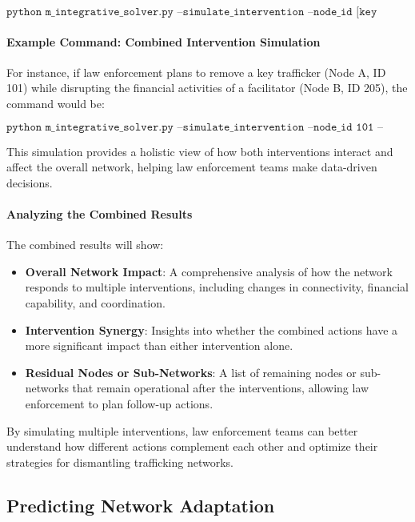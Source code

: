 \documentclass[%
 preprint, linenumbers,
 amsmath,amssymb,
 aps, physrev,
]{revtex4-2}
\begin{document}
\[
\texttt{python m\_integrative\_solver.py --simulate\_intervention --node\_id [key trafficker ID] --disrupt\_financial --node\_id [financial facilitator ID]}
\]

\paragraph{Example Command: Combined Intervention Simulation}

For instance, if law enforcement plans to remove a key trafficker (Node A, ID 101) while disrupting the financial activities of a facilitator (Node B, ID 205), the command would be:

\[
\texttt{python m\_integrative\_solver.py --simulate\_intervention --node\_id 101 --disrupt\_financial --node\_id 205}
\]

This simulation provides a holistic view of how both interventions interact and affect the overall network, helping law enforcement teams make data-driven decisions.

\paragraph{Analyzing the Combined Results}

The combined results will show:
\begin{itemize}
    \item \textbf{Overall Network Impact}: A comprehensive analysis of how the network responds to multiple interventions, including changes in connectivity, financial capability, and coordination.
    \item \textbf{Intervention Synergy}: Insights into whether the combined actions have a more significant impact than either intervention alone.
    \item \textbf{Residual Nodes or Sub-Networks}: A list of remaining nodes or sub-networks that remain operational after the interventions, allowing law enforcement to plan follow-up actions.
\end{itemize}

By simulating multiple interventions, law enforcement teams can better understand how different actions complement each other and optimize their strategies for dismantling trafficking networks.

\subsection{Predicting Network Adaptation}
\end{document}
